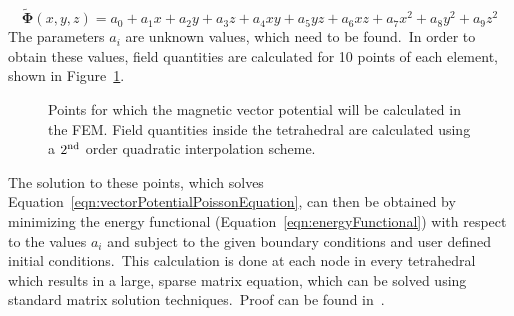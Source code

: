 \begin{equation}
	\tilde{\mathbf{\Phi}}(x,y,z) = a_{0}+a_{1}x+a_{2}y+a_{3}z+a_{4}xy+a_{5}yz+a_{6}xz+a_{7}x^{2}+a_{8}y^{2}+a_{9}z^{2}
	\label{eqn:basisFunction}
\end{equation}
The parameters $a_{i}$ are unknown values, which need to be found.\ In order to obtain these values, field quantities are calculated for 10 points of each element, shown in Figure~\ref{fig:finiteElementMethodPoints}.\
\begin{figure}[htb]
\centering
  \caption[Interpolation points on a single element in FEM]{Points for which the magnetic vector potential will be calculated in the FEM. Field quantities inside the tetrahedral are calculated using a $2\textsuperscript{nd}$ order quadratic interpolation scheme.}
  \label{fig:finiteElementMethodPoints}
\end{figure}
The solution to these points, which solves Equation~\ref{eqn:vectorPotentialPoissonEquation}, can then be obtained by minimizing the energy functional (Equation~\ref{eqn:energyFunctional}) with respect to the values $a_{i}$ and subject to the given boundary conditions and user defined initial conditions.\ This calculation is done at each node in every tetrahedral which results in a large, sparse matrix equation, which can be solved using standard matrix solution techniques.\ Proof can be found in~\cite{Mikhlin1964}.\
%
